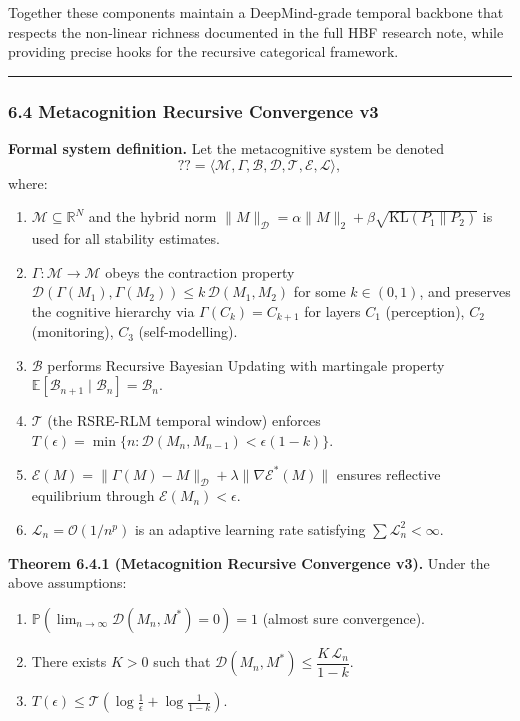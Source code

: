 \documentclass[12pt]{article}
\begin{document}
Together these components maintain a DeepMind-grade temporal backbone that respects the non-linear richness documented in the full HBF research note, while providing precise hooks for the recursive categorical framework.

\begin{center}\rule{0.5\linewidth}{0.5pt}\end{center}

\subsubsection{\texorpdfstring{\textbf{6.4 Metacognition Recursive Convergence v3}}{6.4 Metacognition Recursive Convergence v3}}\label{mrc-v3}

\textbf{Formal system definition.}
Let the metacognitive system be denoted
\[
?? = \langle \mathcal{M}, \Gamma, \mathcal{B}, \mathcal{D}, \mathcal{T}, \mathcal{E}, \mathcal{L} \rangle,
\]
where:
\begin{enumerate}
\item $\mathcal{M} \subseteq \mathbb{R}^N$ and the hybrid norm $\|M\|_{\mathcal{D}} = \alpha \|M\|_2 + \beta \sqrt{\mathrm{KL}(P_1 \| P_2)}$ is used for all stability estimates.
\item $\Gamma : \mathcal{M} \rightarrow \mathcal{M}$ obeys the contraction property
\(
\mathcal{D}(\Gamma(M_1), \Gamma(M_2)) \leq k\, \mathcal{D}(M_1, M_2)
\)
for some $k \in (0,1)$, and preserves the cognitive hierarchy via $\Gamma(C_k) = C_{k+1}$ for layers $C_1$ (perception), $C_2$ (monitoring), $C_3$ (self-modelling).
\item $\mathcal{B}$ performs Recursive Bayesian Updating with martingale property $\mathbb{E}[\mathcal{B}_{n+1} \mid \mathcal{B}_n] = \mathcal{B}_n$.
\item $\mathcal{T}$ (the RSRE-RLM temporal window) enforces $T(\epsilon) = \min\{ n : \mathcal{D}(M_n, M_{n-1}) < \epsilon (1-k) \}$.
\item $\mathcal{E}(M) = \|\Gamma(M) - M\|_{\mathcal{D}} + \lambda \|\nabla \mathcal{E}^*(M)\|$ ensures reflective equilibrium through $\mathcal{E}(M_n) < \epsilon$.
\item $\mathcal{L}_n = \mathcal{O}(1/n^p)$ is an adaptive learning rate satisfying $\sum \mathcal{L}_n^2 < \infty$.
\end{enumerate}

\textbf{Theorem 6.4.1 (Metacognition Recursive Convergence v3).}
Under the above assumptions:
\begin{enumerate}
\item $\mathbb{P}\!\left(\lim_{n\to\infty} \mathcal{D}(M_n, M^*) = 0\right) = 1$ (almost sure convergence).
\item There exists $K>0$ such that $\mathcal{D}(M_n, M^*) \leq \dfrac{K\,\mathcal{L}_n}{1-k}$.
\item $T(\epsilon) \leq \mathcal{T}\!\left(\log \tfrac{1}{\epsilon} + \log \tfrac{1}{1-k}\right)$.
\end{enumerate}
\end{document}
